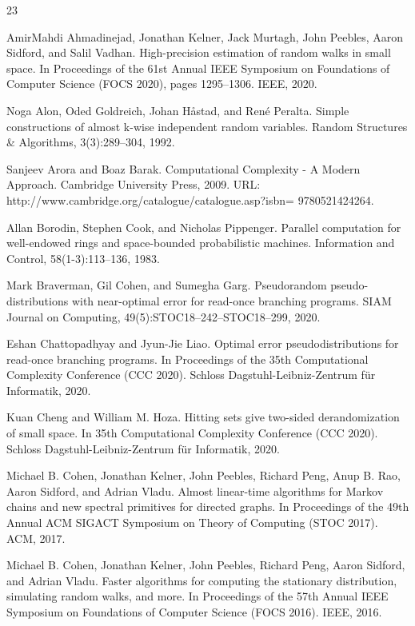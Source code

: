 \documentclass[10pt,a4paper]{article}
\begin{document}
\begin{thebibliography}{23}

AmirMahdi Ahmadinejad, Jonathan Kelner, Jack Murtagh, John Peebles, Aaron Sidford, and Salil Vadhan. High-precision estimation of random walks in small space. In Proceedings of the 61st Annual IEEE Symposium on Foundations of Computer Science (FOCS 2020), pages 1295–1306. IEEE, 2020.

Noga Alon, Oded Goldreich, Johan Håstad, and René Peralta. Simple constructions of almost k-wise independent random variables. Random Structures \& Algorithms, 3(3):289–304, 1992.

Sanjeev Arora and Boaz Barak. Computational Complexity - A Modern Approach. Cambridge University Press, 2009. URL: http://www.cambridge.org/catalogue/catalogue.asp?isbn= 9780521424264.

Allan Borodin, Stephen Cook, and Nicholas Pippenger. Parallel computation for well-endowed rings and space-bounded probabilistic machines. Information and Control, 58(1-3):113–136, 1983.

Mark Braverman, Gil Cohen, and Sumegha Garg. Pseudorandom pseudo-distributions with near-optimal error for read-once branching programs. SIAM Journal on Computing, 49(5):STOC18–242–STOC18–299, 2020.

Eshan Chattopadhyay and Jyun-Jie Liao. Optimal error pseudodistributions for read-once branching programs. In Proceedings of the 35th Computational Complexity Conference (CCC 2020). Schloss Dagstuhl-Leibniz-Zentrum für Informatik, 2020.

Kuan Cheng and William M. Hoza. Hitting sets give two-sided derandomization of small space. In 35th Computational Complexity Conference (CCC 2020). Schloss Dagstuhl-Leibniz-Zentrum für Informatik, 2020.

Michael B. Cohen, Jonathan Kelner, John Peebles, Richard Peng, Anup B. Rao, Aaron Sidford, and Adrian Vladu. Almost linear-time algorithms for Markov chains and new spectral primitives for directed graphs. In Proceedings of the 49th Annual ACM SIGACT Symposium on Theory of Computing (STOC 2017). ACM, 2017.

Michael B. Cohen, Jonathan Kelner, John Peebles, Richard Peng, Aaron Sidford, and Adrian Vladu. Faster algorithms for computing the stationary distribution, simulating random walks, and more. In Proceedings of the 57th Annual IEEE Symposium on Foundations of Computer Science (FOCS 2016). IEEE, 2016.


\end{thebibliography}
\end{document}
